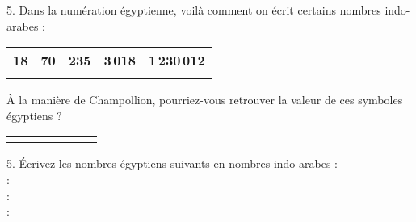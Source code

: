 \documentclass[12pt,a4paper]{article}
\begin{document}
\pagebreak
\thispagestyle{empty}
   
   5. Dans la numération égyptienne, voilà comment on écrit certains nombres indo-arabes :
\begin{center} 
   \renewcommand*\tabularxcolumn[1]{>{\centering\arraybackslash}m{#1}}   
   \begin{tabular}{|c|c|c|c|c|}
      \hline
      18 & 70 & 235 & 3\,018 & 1\,230\,012 \\
      \hline
      \Large\textpmhg{\Hten\Hone\Hone\Hone\Hone\Hone\Hone\Hone\Hone}
      &
      \Large\textpmhg{\Hten\Hten\Hten\Hten\Hten\Hten\Hten}
      & 
      \Large\textpmhg{\Hhundred\Hhundred\Hten\Hten\Hten\Hone\Hone\Hone\Hone\Hone} & \Large\textpmhg{\Hthousand\Hthousand\Hthousand\Hten\Hone\Hone\Hone\Hone\Hone\Hone\Hone\Hone}
      &
      \Large\textpmhg{\Hmillion\HCthousand\HCthousand\HXthousand\HXthousand\HXthousand\Hten\Hone\Hone} \\
      \hline
   \end{tabular}
\end{center}
À la manière de Champollion, pourriez-vous retrouver la valeur de ces symboles égyptiens ?  
   \begin{center}
      \renewcommand*\tabularxcolumn[1]{>{\centering\arraybackslash}m{#1}}
      \begin{tabular}{|C{1.8}|C{1.8}|C{1.8}|C{1.8}|C{1.8}|C{1.8}|C{1.8}|}
         \hline
         \Large\textpmhg{\Hone}
         &
         \Large\textpmhg{\Hten}
         &
         \Large\textpmhg{\Hhundred}
         &
         \Large\textpmhg{\Hthousand}
         &
         \Large\textpmhg{\HXthousand}
         &
         \Large\textpmhg{\HCthousand}
         &
         \Large\textpmhg{\Hmillion} \\
         \hline
         & & & & & & \\
        \hline
      \end{tabular}
   \end{center}

\bigskip

   5. Écrivez les nombres égyptiens suivants en nombres indo-arabes : \\ [2mm]
   {\Large\textpmhg{\HXthousand\Hthousand\Hthousand\Hten\Hten\Hten\Hten\Hten\Hten}} :  \\ [5mm]
   {\Large\textpmhg{\HCthousand\HXthousand\HXthousand\HXthousand\Hthousand\Hthousand\Hthousand\Hhundred\Hhundred\Hhundred\Hten\Hten\Hten\Hten\Hone\Hone\Hone\Hone\Hone\Hone\Hone\Hone}} :  \\  [5mm]
   {\Large\textpmhg{\Hmillion\Hmillion\Hmillion\HCthousand\Hone\Hone}} :  \\  [3mm]
\end{document}
